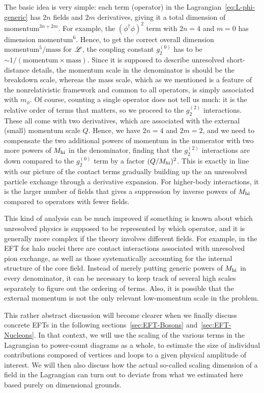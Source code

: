 The basic idea is very simple: each term (operator) in the 
Lagrangian~\eqref{eq:L-phi-generic} has $2n$ fields and $2m$ derivatives, 
giving it a total dimension of $\text{momentum}^{3n+2m}$.  For example, the 
$(\phi^\dagger \phi)^2$ term with $2n=4$ and $m=0$ has dimension 
$\text{momentum}^6$.  Hence, to get the correct overall dimension 
$\text{momentum}^5/\text{mass}$ for $\mathcal{L}$, the coupling constant $g_{2}^{(0)}$ 
has to be $\sim 1/(\text{momentum}\times\text{mass})$.  Since it is supposed to 
describe unresolved short-distance details, the momentum scale in the 
denominator is should be the breakdown scale, whereas the mass scale, which 
as we mentioned is a feature of the nonrelativistic framework and common to 
all operators, is simply associated with $m_\phi$.  Of course, counting a 
single operator does not tell us much: it is the relative order of terms that 
matters, so we proceed to the $g_2^{(2)}$ interactions.  These all come with 
two derivatives, which are associated with the external (small) momentum scale 
$Q$. Hence, we have $2n=4$ and $2m=2$, and we need to compensate the two 
additional powers of momentum in the numerator with two more powers of 
$M_{\rm hi}$ in the denominator, finding that the $g_2^{(2)}$ interactions are 
down compared to the $g_2^{(0)}$ term by a factor $(Q/M_{\rm hi})^2$.  This is 
exactly in line with our picture of the contact terms gradually building up the 
an unresolved particle exchange through a derivative expansion.  For 
higher-body interactions, it is the larger number of fields that gives a 
suppression by inverse powers of $M_{\rm hi}$ compared to operators with fewer 
fields.

This kind of analysis can be much improved if something is known about which 
unresolved physics is supposed to be represented by which operator, and it is 
generally more complex if the theory involves different fields.  For example, in 
the EFT for halo nuclei there are contact interactions associated with 
unresolved pion exchange, as well as those systematically accounting for the 
internal structure of the core field.  Instead of merely putting generic powers 
of $M_{\rm hi}$ in every denominator, it can be necessary to keep track of several 
high scales separately to figure out the ordering of terms.  Also, it is 
possible that the external momentum is not the only relevant low-momentum scale 
in the problem.

This rather abstract discussion will become clearer when we finally discuss 
concrete EFTs in the following sections~\ref{sec:EFT-Bosons} 
and~\ref{sec:EFT-Nucleons}.  In that context, we will use the scaling of 
the various terms in the Lagrangian to power-count diagrams as a 
whole, \ie to estimate the size of individual contributions composed of 
vertices and loops to a given physical amplitude of interest.  We will then 
also discuss how the actual so-called scaling dimension of a field in the 
Lagrangian can turn out to deviate from what we estimated here based purely on 
dimensional grounds.

